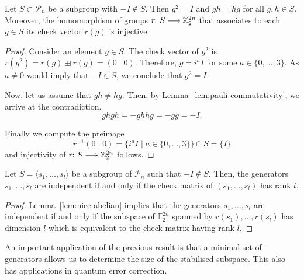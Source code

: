 \documentclass[a4paper, oneside, 12pt]{amsart}
\newcommand*{\PauliGroup}{\ensuremath{\mathcal{P}}}
\begin{document}
  \begin{lemma}\label{lem:nice-abelian}
    Let \(S\subset \PauliGroup_{n}\) be a subgroup with \(-I \notin S\).
    Then \(g^{2}=I\) and  \(gh = hg\) for all \(g, h\in S\).
    Moreover, the homomorphism of groups \(r \from S\to \mathbb{Z}_{2}^{2n}\) that associates to each \(g\in S \) its check vector \(r(g)\) is injective.
  \end{lemma}
  \begin{proof}
    Consider an element \(g \in S\).
    The check vector of \(g^{2}\) is \(r(g^{2}) = r(g) \boxplus r(g) = (0\mid 0)\).
    Therefore, \(g=i^{a}I\) for some \(a \in\{0, \dots , 3\}\).
    As \(a \neq 0\) would imply that \(-I \in S\), we conclude that \(g^{2}= I\).

    Now, let us assume that \(gh \neq hg\).
    Then, by Lemma~\ref{lem:pauli-commutativity}, we arrive at the contradiction.
    \begin{equation*}
      ghgh = - ghhg = -gg = -I.
    \end{equation*}

    Finally we compute the preimage
    \begin{equation*}
      r^{-1}(0 \mid 0) = \{i^{a}I \mid a \in \{0, \dots , 3\}\} \cap S = \{I\}
    \end{equation*}
    and injectivity of \(r\from S \to \mathbb{Z}_{2}^{2n}\) follows.
  \end{proof}



\begin{proposition}\label{prop:minimal-generating-set}
  Let \(S= \langle s_{1}, \dots , s_{l}\rangle\) be a subgroup of \(\PauliGroup_{n}\) such that \(-I \notin S\).
  Then, the generators  \(s_{1}, \dots , s_{l}\) are independent if and only if the check matrix of \((s_{1}, \dots , s_{l})\) has rank \(l\).
\end{proposition}
\begin{proof}
  Lemma~\ref{lem:nice-abelian} implies that the generators  \(s_{1}, \dots , s_{l}\) are independent if and only if the subspace  of \( \mathbb{F}_{2}^{2n}\) spanned by \(r(s_{1}), \dots , r(s_{l})\) has dimension \(l\) which is equivalent to the check matrix having rank \( l \).
\end{proof}

An important application of the previous result is that a minimal set of generators allows us to determine the size of the stabilised subspace.
This also has applications in quantum error correction.
\end{document}
